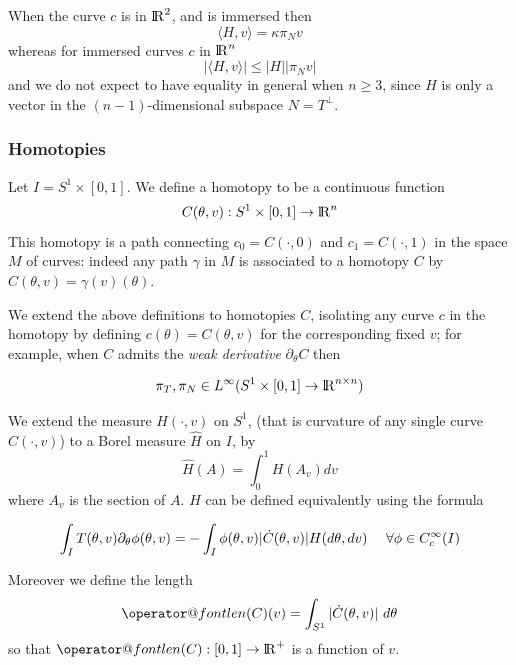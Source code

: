 \documentclass[twoside,a4paper,english]{article}
\makeatletter
\def\derpar#1{\partial_{#1}}
\def\len{\mathop{\operator@font len}\nolimits}
\makeatother
\begin{document}
\begin{Remark}
  When the curve $c$ is in ${\protect\mathrm{l\hskip-0.15em R}}^2$, and is immersed then
  \[ \langle H, v\rangle = \kappa \pi_N v \]
  whereas for immersed curves  $c$ in ${\protect\mathrm{l\hskip-0.15em R}}^n$
  \begin{equation}
    |\langle H, v\rangle| \le |H| |\pi_N v| \label{eq:H,v<H,pi_nv}
  \end{equation}
  and we do not expect to have equality in general when $n\ge 3$,
  since $H$ is only a vector in the $(n-1)$-dimensional 
  subspace $N=T^\perp$.
\end{Remark}


\subsubsection{Homotopies}
\label{def: homotopy}

Let $I=S^1\times [0,1]$.
We define a homotopy to be a continuous function
$$C(\theta, v):S^1\times [0,1]\to {\protect\mathrm{l\hskip-0.15em R}} ^n$$ 
This homotopy is a path connecting
$c_0=C(\cdot, 0)$ and $c_1=C(\cdot, 1)$
in the space $M$ of curves:
indeed any path $\gamma$ in $M$ is associated 
to a homotopy $C$ by  $C(\theta,v)=\gamma(v)(\theta)$.


We extend the above definitions to homotopies $C$,
isolating any curve $c$ in the homotopy by defining
$c(\theta)=C(\theta,v)$ for the corresponding fixed $v$;
for example, when
$C$ admits the \emph{weak derivative} $\derpar \theta C$ then

\[\pi_T, \pi_N\in L^\infty(S^1\times[0,1]\to {\protect\mathrm{l\hskip-0.15em R}}^{n\times n})\]

\begin{Remark}\label{extend H}
  We extend the measure $H(\cdot,v)$ on $S^1$, (that is curvature of
  any single curve $C(\cdot,v)$) to a Borel measure $\hat H$ on $I$,
  by
  \begin{equation}
   \hat H(A) = \int_0^1 H(A_v)dv\label{eq:extend H}   
 \end{equation}
  where $A_v$ is the section of $A$. 
$H$ can be defined equivalently  using the formula

    $$\int_I T(\theta,v) \derpar \theta\phi(\theta,v)  = 
    - \int_I  \phi(\theta,v) |\overdot C(\theta,v)| H(d\theta,dv)
    ~~~~\forall \phi\in C^\infinity_c (I)$$
  \end{Remark}

\noindent
Moreover we define the length
$$ \len(C)(v)=\int_{S^1}|\overdot C(\theta,v)|~d\theta $$
so that $\len(C):[0,1]\to\real^+$ is a function of $v$.
\end{document}

